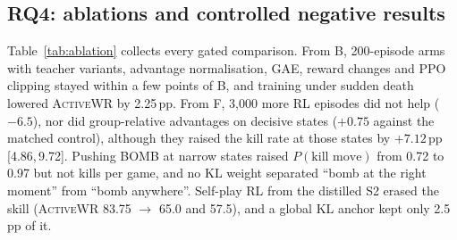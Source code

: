 \documentclass[journal]{IEEEtran}
\newcommand{\awr}{\textsc{ActiveWR}}
\newcommand{\pp}{\,pp}
\newcommand{\ci}[2]{[#1,\,#2]}
\begin{document}
\subsection{RQ4: ablations and controlled negative results}
\label{sec:rq4}
Table~\ref{tab:ablation} collects every gated comparison. From B, 200-episode arms with teacher variants, advantage normalisation, GAE, reward changes and PPO clipping stayed within a few points of B, and training under sudden death lowered \awr{} by 2.25\pp{}. From F, 3{,}000 more RL episodes did not help ($-6.5$), nor did group-relative advantages on decisive states ($+0.75$ against the matched control), although they raised the kill rate at those states by $+7.12$\pp{} \ci{4.86}{9.72}. Pushing BOMB at narrow states raised $P(\text{kill move})$ from 0.72 to 0.97 but not kills per game, and no KL weight separated ``bomb at the right moment'' from ``bomb anywhere''. Self-play RL from the distilled S2 erased the skill (\awr{} 83.75 $\rightarrow$ 65.0 and 57.5), and a global KL anchor kept only 2.5\pp{} of it.
\end{document}
